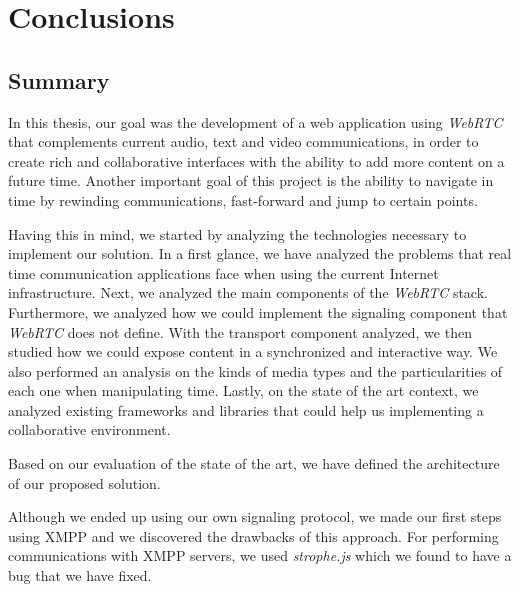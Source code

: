 \chapter{Conclusions}
\label{chapter:conclusion}

\section{Summary}
\label{section:summary}
In this thesis, our goal was the development of a web application using \emph{WebRTC} that complements current audio, text and video communications, in order to create rich and collaborative interfaces with the ability to add more content on a future time. Another important goal of this project is the ability to navigate in time by rewinding communications, fast-forward and jump to certain points.

Having this in mind, we started by analyzing the technologies necessary to implement our solution. In a first glance, we have analyzed the problems that real time communication applications face when using the current Internet infrastructure. Next, we analyzed the main components of the \emph{WebRTC} stack. Furthermore, we analyzed how we could implement the signaling component that \emph{WebRTC} does not define. With the transport component analyzed, we then studied how we could expose content in a synchronized and interactive way. We also performed an analysis on the kinds of media types and the particularities of each one when manipulating time. Lastly, on the state of the art context, we analyzed existing frameworks and libraries that could help us implementing a collaborative environment.

Based on our evaluation of the state of the art, we have defined the architecture of our proposed solution.


Although we ended up using our own signaling protocol, we made our first steps using \ac{XMPP} and we  discovered the drawbacks of this approach. For performing communications with \ac{XMPP} servers, we used \emph{strophe.js} which we found to have a bug that we have fixed.

